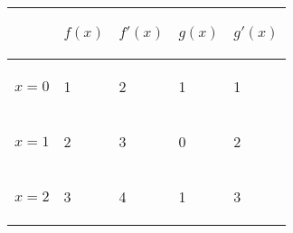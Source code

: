 \documentclass{article}
\begin{document}
\begin{table}[!h]
    \centering
\begin{tabular}{|p{}|p{}|p{}|p{}|p{}|}
\hline 
\begin{center}
\end{center}
& \begin{center}
$\displaystyle f( x)$
\end{center}
& \begin{center}
$\displaystyle f'( x)$
\end{center}
& \begin{center}
$\displaystyle g( x)$
\end{center}
& \begin{center}
$\displaystyle g'( x)$
\end{center}
\\
\hline 
\begin{center}
$\displaystyle x=0$
\end{center}
& \begin{center}
1
\end{center}
& \begin{center}
2
\end{center}
& \begin{center}
1
\end{center}
& \begin{center}
1
\end{center}
\\
\hline 
\begin{center}
$\displaystyle x=1$
\end{center}
& \begin{center}
2
\end{center}
& \begin{center}
3
\end{center}
& \begin{center}
0
\end{center}
& \begin{center}
2
\end{center}
\\
\hline 
\begin{center}
$\displaystyle x=2$
\end{center}
& \begin{center}
3
\end{center}
& \begin{center}
4
\end{center}
& \begin{center}
1
\end{center}
& \begin{center}
3
\end{center}
\\
\hline
\end{tabular}
    
\end{table}\\
\end{document}
